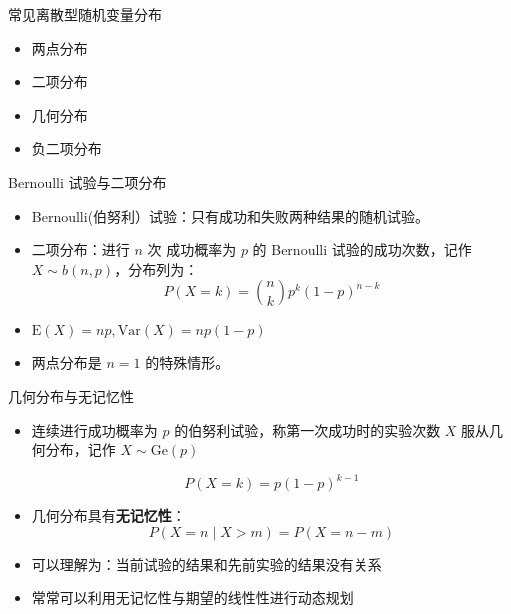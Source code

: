 \documentclass{beamer}
\newcommand{\E}{\text{E}}
\newcommand{\var}{\text{Var}}
\begin{document}
    \begin{frame}{常见离散型随机变量分布}
        \begin{itemize}
            \setlength{\itemsep}{10pt}
            \item 两点分布
            \item 二项分布
            \item 几何分布
            \item 负二项分布
        \end{itemize}
    \end{frame}

    \begin{frame}{Bernoulli 试验与二项分布}
        \begin{itemize}
            \setlength{\itemsep}{10pt}
            \item Bernoulli(伯努利）试验：只有成功和失败两种结果的随机试验。
            \item 二项分布：进行 $n$ 次 成功概率为 $p$ 的 Bernoulli 试验的成功次数，记作 $X\sim b(n,p)$，分布列为：
            $$
                P(X=k)=\binom{n}{k}p^k(1-p)^{n-k}
            $$
            \item $\E(X)=np,\var(X)=np(1-p)$
            \item 两点分布是 $n=1$ 的特殊情形。
        \end{itemize}
    \end{frame}

    \begin{frame}{几何分布与无记忆性}
        \begin{itemize}
            \setlength{\itemsep}{10pt}
            \item 连续进行成功概率为 $p$ 的伯努利试验，称第一次成功时的实验次数 $X$ 服从几何分布，记作 $X\sim \text{Ge}(p)$
            
            $$
                P(X=k)=p(1-p)^{k-1}
            $$

            \item 几何分布具有\textbf{无记忆性}：
            $$
                P(X=n \mid X > m) = P(X= n - m)
            $$
            \item 可以理解为：当前试验的结果和先前实验的结果没有关系
            \item 常常可以利用无记忆性与期望的线性性进行动态规划
        \end{itemize}
    \end{frame}
\end{document}
